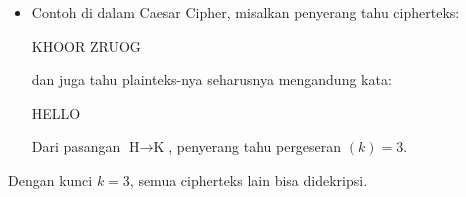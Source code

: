 \documentclass{article}
\begin{document}

\begin{itemize}
    \item Contoh di dalam Caesar Cipher, misalkan penyerang tahu cipherteks:
    
    KHOOR ZRUOG
    
    dan juga tahu plainteks-nya seharusnya mengandung kata:
    
    HELLO
    
    Dari pasangan $\text{H} \rightarrow \text{K}$, penyerang tahu pergeseran $(k) = 3$.
\end{itemize}

Dengan kunci $k = 3$, semua cipherteks lain bisa didekripsi.
\end{document}
